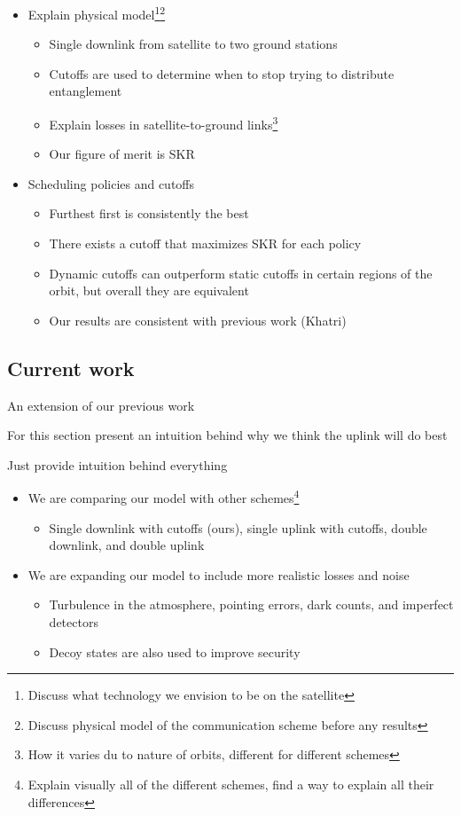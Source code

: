 \documentclass[12pt]{article}
\begin{document}
\begin{itemize}
    \item Explain physical model\footnote{Discuss what technology we envision to be on the satellite}\footnote{Discuss physical model of the communication scheme before any results}
    \begin{itemize}
        \item Single downlink from satellite to two ground stations
        \item Cutoffs are used to determine when to stop trying to distribute entanglement
        \item Explain losses in satellite-to-ground links\footnote{How it varies du to nature of orbits, different for different schemes}
        \item Our figure of merit is SKR
    \end{itemize}
    \item Scheduling policies and cutoffs
    \begin{itemize}
        \item Furthest first is consistently the best
        \item There exists a cutoff that maximizes SKR for each policy
        \item Dynamic cutoffs can outperform static cutoffs in certain regions of the orbit, but overall they are equivalent
        \item Our results are consistent with previous work (Khatri)
    \end{itemize}
\end{itemize}

\subsection{Current work}

An extension of our previous work

For this section present an intuition behind why we think the uplink will do best

Just provide intuition behind everything

\begin{itemize}
    \item We are comparing our model with other schemes\footnote{Explain visually all of the different schemes, find a way to explain all their differences}
    \begin{itemize}
        \item Single downlink with cutoffs (ours), single uplink with cutoffs, double downlink, and double uplink
    \end{itemize}
    \item We are expanding our model to include more realistic losses and noise
    \begin{itemize}
        \item Turbulence in the atmosphere, pointing errors, dark counts, and imperfect detectors
        \item Decoy states are also used to improve security
    \end{itemize}
\end{itemize}
\end{document}
